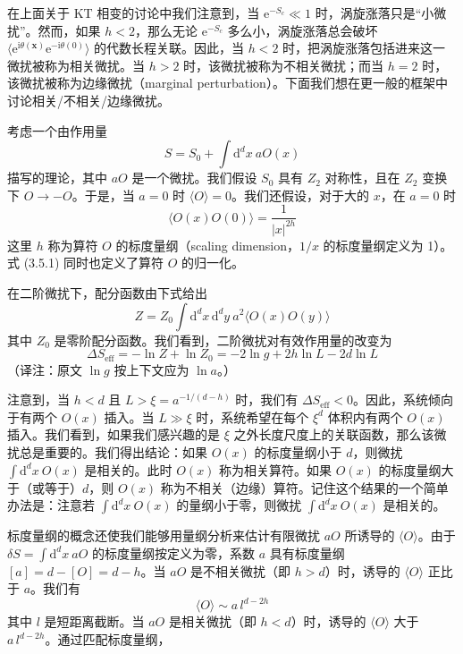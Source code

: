 在上面关于 KT 相变的讨论中我们注意到，当 $\mathrm{e}^{-S_{c}} \ll 1$ 时，涡旋涨落只是“小微扰”。然而，如果 $h < 2$，那么无论 $\mathrm{e}^{-S_{c}}$ 多么小，涡旋涨落总会破坏 $\langle \mathrm{e}^{\mathrm{i}\theta(\pmb{x})}\mathrm{e}^{-\mathrm{i}\theta(0)}\rangle$ 的代数长程关联。因此，当 $h<2$ 时，把涡旋涨落包括进来这一微扰被称为相关微扰。当 $h>2$ 时，该微扰被称为不相关微扰；而当 $h=2$ 时，该微扰被称为边缘微扰（marginal perturbation）。下面我们想在更一般的框架中讨论相关/不相关/边缘微扰。

考虑一个由作用量
\begin{equation*}
S = S_{0} + \int \mathrm{d}^{d}x\ aO(x)
\end{equation*}
描写的理论，其中 $aO$ 是一个微扰。我们假设 $S_{0}$ 具有 $Z_{2}$ 对称性，且在 $Z_{2}$ 变换下 $O \to -O$。于是，当 $a=0$ 时 $\langle O\rangle = 0$。我们还假设，对于大的 $x$，在 $a=0$ 时
\begin{equation*}
\langle O(x)O(0)\rangle = \frac{1}{|x|^{2h}}
\tag{3.5.1}
\end{equation*}
这里 $h$ 称为算符 $O$ 的标度量纲（scaling dimension，$1/x$ 的标度量纲定义为 1）。式 (3.5.1) 同时也定义了算符 $O$ 的归一化。

在二阶微扰下，配分函数由下式给出
\begin{equation*}
Z = Z_{0} \int \mathrm{d}^{d}x\,\mathrm{d}^{d}y\ a^{2}\langle O(x)O(y)\rangle
\end{equation*}
其中 $Z_{0}$ 是零阶配分函数。我们看到，二阶微扰对有效作用量的改变为
\begin{equation*}
\Delta S_{\mathrm{eff}} = -\ln Z + \ln Z_{0} = -2\ln g + 2h\ln L - 2d\ln L
\end{equation*}
（译注：原文 $\ln g$ 按上下文应为 $\ln a$。）

注意到，当 $h < d$ 且 $L > \xi = a^{-1/(d-h)}$ 时，我们有 $\Delta S_{\mathrm{eff}} < 0$。因此，系统倾向于有两个 $O(x)$ 插入。当 $L \gg \xi$ 时，系统希望在每个 $\xi^{d}$ 体积内有两个 $O(x)$ 插入。我们看到，如果我们感兴趣的是 $\xi$ 之外长度尺度上的关联函数，那么该微扰总是重要的。我们得出结论：如果 $O(x)$ 的标度量纲小于 $d$，则微扰 $\int \mathrm{d}^{d}x\ O(x)$ 是相关的。此时 $O(x)$ 称为相关算符。如果 $O(x)$ 的标度量纲大于（或等于）$d$，则 $O(x)$ 称为不相关（边缘）算符。记住这个结果的一个简单办法是：注意若 $\int \mathrm{d}^{d}x\ O(x)$ 的量纲小于零，则微扰 $\int \mathrm{d}^{d}x\ O(x)$ 是相关的。

标度量纲的概念还使我们能够用量纲分析来估计有限微扰 $aO$ 所诱导的 $\langle O\rangle$。由于 $\delta S = \int \mathrm{d}^{d}x\ aO$ 的标度量纲按定义为零，系数 $a$ 具有标度量纲 $[a] = d - [O] = d - h$。当 $aO$ 是不相关微扰（即 $h > d$）时，诱导的 $\langle O\rangle$ 正比于 $a$。我们有
\begin{equation*}
\langle O\rangle \sim a\,l^{d-2h}
\end{equation*}
其中 $l$ 是短距离截断。当 $aO$ 是相关微扰（即 $h < d$）时，诱导的 $\langle O\rangle$ 大于 $a\,l^{d-2h}$。通过匹配标度量纲，


